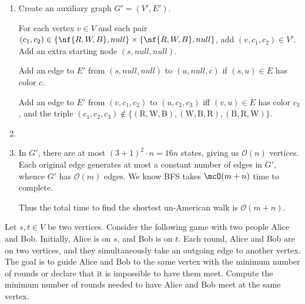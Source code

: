\documentclass{article}
\begin{document}
\begin{solution}

\begin{enumerate}[label=(\alph*)]
  \item Create an auxiliary graph $G' = (V', E')$.

  For each vertex $v \in V$ and each pair $(c_1, c_2) \in \{\nf{R,W,B}, null\}\times \{\nf{R,W,B}, null\}$, add $(v, c_1, c_2) \in V'$.
  Add an extra starting node $(s, null, null)$.

  Add an edge to $ E' $ from $(s, null, null)$ to $(u, null, c)$ if $(s,u)\in E$ has color $c$.

  Add an edge to $ E' $ from  $(v, c_1, c_2) $ to $ (u, c_2, c_3)$ iff $(v,u)\in E$ has color $c_3$, and the triple $(c_1, c_2, c_3)\not\in \{ (\mathrm{R},\mathrm{W},\mathrm{B}), (\mathrm{W},\mathrm{B},\mathrm{R}), (\mathrm{B},\mathrm{R},\mathrm{W}) \}.$

  \item {}

  \item In $G'$, there are at most $(3 + 1)^2 \cdot n = 16n$ states, giving us $\mathcal{O}(n)$ vertices.
  Each original edge generates at most a constant number of edges in $G'$, whence $G'$ has $\mathcal{O}(m)$ edges.
  We know BFS takes $ \mcO(m+n) $ time to complete.

  Thus the total time to find the shortest un-American walk is $\mathcal{O}(m + n)$.
\end{enumerate}
\end{solution}
\pagebreak

\begin{subexercise} %
  Let $ s,t\in V $ be two vertices.
  Consider the following game with two people Alice and Bob.
  Initially, Alice is on $ s $, and Bob is on $ t $.
  Each round, Alice and Bob are on two vertices, and they simultaneously take an outgoing edge to another vertex.
  The goal is to guide Alice and Bob to the same vertex with the minimum number of rounds or declare that it is impossible to have them meet.
  Compute the minimum number of rounds needed to have Alice and Bob meet at the same vertex.
\end{subexercise}
\end{document}
